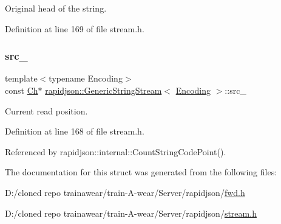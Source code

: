 Original head of the string. 



Definition at line 169 of file stream.\+h.

\mbox{\label{structrapidjson_1_1_generic_string_stream_a9a38a9d5b1ce782cacd4ec1bdf87fc2d}} 
\subsubsection{\texorpdfstring{src\_}{src\_}}
{\footnotesize\ttfamily template$<$typename Encoding$>$ \\
const \mbox{\hyperlink{structrapidjson_1_1_generic_string_stream_a70ad06c96ddf8349be59f3d4f6bbadc8}{Ch}}$\ast$ \mbox{\hyperlink{structrapidjson_1_1_generic_string_stream}{rapidjson\+::\+Generic\+String\+Stream}}$<$ \mbox{\hyperlink{classrapidjson_1_1_encoding}{Encoding}} $>$\+::src\+\_\+}



Current read position. 



Definition at line 168 of file stream.\+h.



Referenced by rapidjson\+::internal\+::\+Count\+String\+Code\+Point().



The documentation for this struct was generated from the following files\+:\begin{DoxyCompactItemize}
\item 
D\+:/cloned repo trainawear/train-\/\+A-\/wear/\+Server/rapidjson/\mbox{\hyperlink{fwd_8h}{fwd.\+h}}\item 
D\+:/cloned repo trainawear/train-\/\+A-\/wear/\+Server/rapidjson/\mbox{\hyperlink{stream_8h}{stream.\+h}}\end{DoxyCompactItemize}

